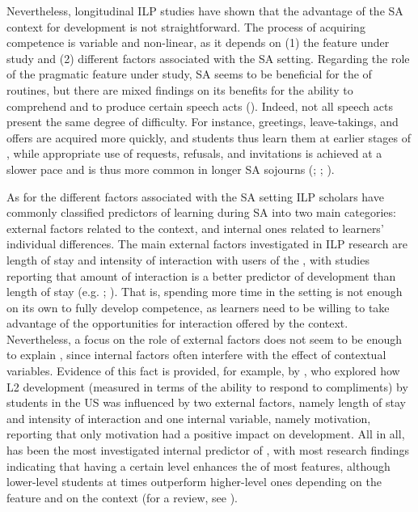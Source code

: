 \documentclass[output=paper]{langsci/langscibook}
\begin{document}
Nevertheless, longitudinal ILP studies have shown that the advantage of the SA context for  development is not straightforward. The process of acquiring   competence is variable and non-linear, as it depends on (1) the  feature under study and (2) different factors associated with the SA setting. Regarding the role of the pragmatic feature under study, SA seems to be beneficial for the  of  routines, but there are mixed findings on its benefits for the ability to comprehend  and to produce certain speech acts (\citealt{TaguchiRoever2017}). Indeed, not all speech acts present the same degree of difficulty. For instance, greetings, leave-takings, and offers are acquired more quickly, and students thus learn them at earlier stages of , while appropriate use of requests, refusals, and invitations is achieved at a slower pace and is thus more common in longer SA sojourns (\citealt{Barron2003}; \citealt{Félix-Brasdefer2004}; \citealt{Hassall2006}).

As for the different factors associated with the SA setting ILP scholars have commonly classified predictors of  learning during SA into two main categories: external factors related to the context, and internal ones related to learners’ individual differences. The main external factors investigated in ILP research are length of stay and intensity of interaction with users of the , with studies reporting that amount of interaction is a better predictor of  development than length of stay (e.g. \citealt{Bardovi-HarligBastos2011}; \citealt{Bella2011}). That is, spending more time in the  setting is not enough on its own to fully develop  competence, as  learners need to be willing to take advantage of the opportunities for interaction offered by the context. Nevertheless, a focus on the role of external factors does not seem to be enough to explain   , since internal factors often interfere with the effect of contextual variables. Evidence of this fact is provided, for example, by \citet{EslamiAhn2014}, who explored how L2  development (measured in terms of the ability to respond to compliments) by  students in the US was influenced by two external factors, namely length of stay and intensity of interaction and one internal variable, namely motivation, reporting that only motivation had a positive impact on  development. All in all,  has been the most investigated internal predictor of  , with most research findings indicating that having a certain  level enhances the  of most  features, although lower-level students at times outperform higher-level ones depending on the  feature and on the context (for a review, see \citealt{Xiao2015}).
\end{document}
